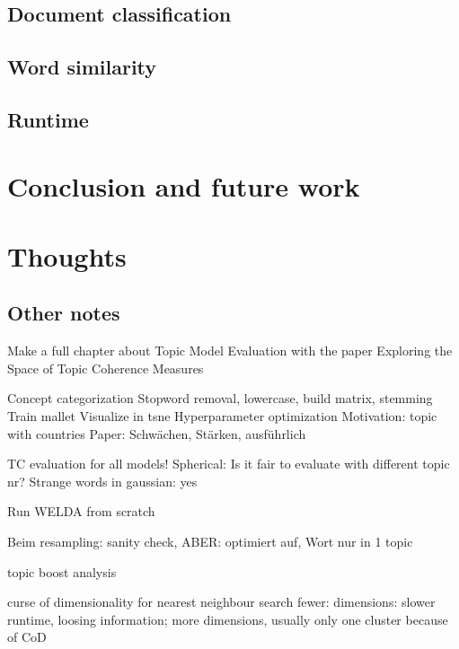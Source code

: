 \documentclass[
        a4paper,
        titlepage,
        twoside,
        parskip
        ]{scrbook}
\theoremstyle{break}
\begin{document}
\section{Document classification}
\section{Word similarity}


\section{Runtime}

\chapter{Conclusion and future work}

\chapter{Thoughts}
\section{Other notes}

Make a full chapter about Topic Model Evaluation with the paper Exploring the Space of Topic Coherence Measures

Concept categorization
Stopword removal, lowercase, build matrix, stemming
Train mallet
Visualize in tsne
Hyperparameter optimization
Motivation: topic with countries
Paper: Schwächen, Stärken, ausführlich

TC evaluation for all models!
Spherical: Is it fair to evaluate with different topic nr?
Strange words in gaussian: yes

Run WELDA from scratch

Beim resampling: sanity check, ABER: optimiert auf, Wort nur in 1 topic

topic boost analysis

curse of dimensionality for nearest neighbour search
fewer: dimensions: slower runtime, loosing information; more dimensions, usually only one cluster because of CoD

\clearpage
\printbibliography

\begin{appendices}
%
\end{appendices}

%
\end{document}
